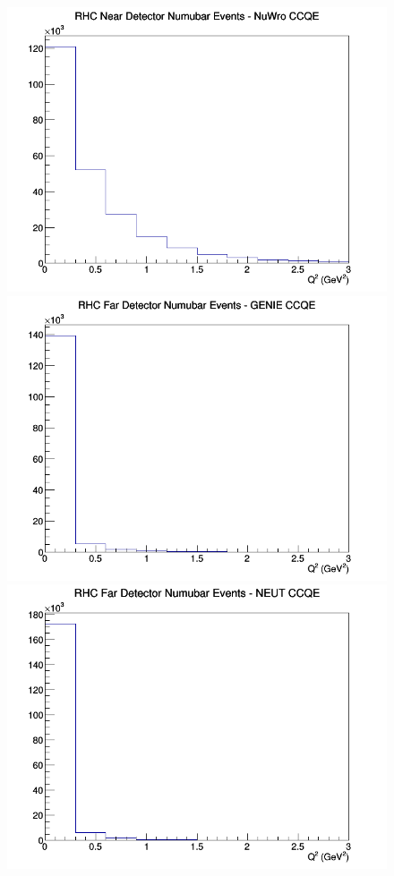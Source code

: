 \begin{figure}[h]
\includegraphics[width=\linewidth]{eff_Q2/GAr/CCQE_RHC_ND_numubar_Q2_NuWro.png}
\endminipage
\newline
{}
\includegraphics[width=\linewidth]{eff_Q2/GAr/CCQE_RHC_FD_numubar_Q2_GENIE.png}
\endminipage
{}
\includegraphics[width=\linewidth]{eff_Q2/GAr/CCQE_RHC_FD_numubar_Q2_NEUT.png}

\end{figure}
